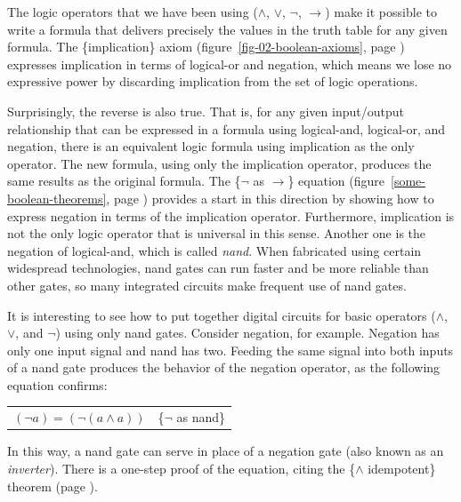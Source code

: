 The logic operators that we have been using
($\wedge$, $\vee$, $\neg$, $\rightarrow$)
make it possible to write a formula
that delivers precisely the values in the truth table
for any given formula.
The \{implication\} axiom
(figure~\ref{fig-02-boolean-axioms}, page \pageref{fig-02-boolean-axioms})
expresses implication in terms of logical-or
and negation, which means we lose no expressive power by
discarding implication from the set of logic operations.

Surprisingly, the reverse is also true.
That is, for any given input/output relationship that can be expressed
in a formula using logical-and, logical-or, and negation,
there is an equivalent logic formula using implication as
the only operator. The new formula, using only the
implication operator, produces the same results
as the original formula.
The \{$\neg$ as $\rightarrow$\} equation
(figure~\ref{some-boolean-theorems}, page \pageref{some-boolean-theorems})
provides a start in this direction by showing how to express
negation in terms of the implication operator.
Furthermore, implication is not the only logic operator
that is universal in this sense.
Another one
is the negation of logical-and, which is called
\emph{nand}.
When fabricated using certain widespread technologies,
nand gates can run faster and be more reliable than other gates,
so many integrated circuits make frequent use of nand gates.

It is interesting to see how to put together digital
circuits for basic operators
($\wedge$, $\vee$, and $\neg$) using only nand gates.
Consider negation, for example.
Negation has only one input signal and nand has two.
Feeding the same signal into both
inputs of a nand gate produces the behavior of
the negation operator,
as the following equation confirms:

\begin{center}
\begin{tabular}{ll}
$(\neg a) = (\neg (a \wedge a))$  & \{$\neg$ as nand\}\label{neg-as-nand}
\end{tabular}
\end{center}

In this way, a nand gate can serve in place of a
negation gate (also known as an \emph{inverter}).
There is a one-step proof of the equation,
citing the \{$\wedge$ idempotent\} theorem
(page \pageref{and-idempotent}).

